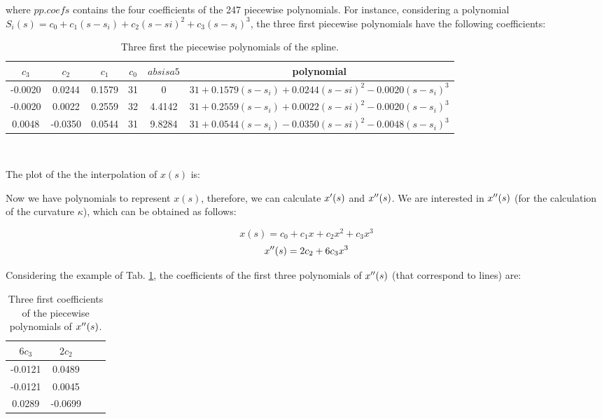 \documentclass{ws-procs9x6}
\begin{document}
where $pp.coefs$ contains the four coefficients of the 247 piecewise
polynomials.  
For instance, considering a polynomial $S_{i}(s)= c_{0} +
c_{1}(s-s_{i})+c_{2}(s-s{i})^{2}+c_{3}(s-s_{i})^{3}$, the three first piecewise polynomials
have the following coefficients:

\begin{table}[h!tpb]
\centering
\begin{tabular}{c  c  c  c  c  c}\\\hline
$c_{3}$ & $c_{2}$ & $c_{1}$ &$c_{0}$ &$absisa5$ & polynomial\\\hline
-0.0020 & 0.0244 & 0.1579 & 31 & 0 &  $31 +0.1579(s-s_{i})+0.0244(s-s{i})^{2}-0.0020(s-s_{i})^{3}$\\\hline
-0.0020 & 0.0022 & 0.2559 & 32 & 4.4142 &$31 +0.2559(s-s_{i})+0.0022(s-s{i})^{2}-0.0020(s-s_{i})^{3}$\\\hline
0.0048 & -0.0350 & 0.0544 & 31 & 9.8284 &$31 +0.0544(s-s_{i})-0.0350(s-s{i})^{2}-0.0048(s-s_{i})^{3}$\\\hline
\end{tabular}\\

\label{tab:coef}
\caption{Three first the piecewise polynomials of the spline.}
\end{table}

The plot of the the interpolation of $x(s)$ is:

\begin{figure}
\end{figure}

\begin{figure}
\centering
{}
\end{figure}





Now we have polynomials to represent $x(s)$, therefore, we can
calculate $x\sp{\prime}(s)$ and $x\sp{\prime\prime}(s)$.  We are
interested in $x\sp{\prime\prime}(s)$ (for the calculation of the
curvature $\kappa$), which can be obtained as follows:


$$x(s)= c_{0} + c_{1}x+c_{2}x^{2}+c_{3}x^{3}$$
$$x\sp{\prime\prime}(s) =  2c_{2}+ 6c_{3}x^{3}$$


Considering the example of Tab. \ref{tab:coef}, the coefficients of
the first three polynomials of $x\sp{\prime\prime}(s)$ (that
correspond to lines) are:

\begin{table}[h!tpb]
\centering
\begin{tabular}{|c | c | c | c |}\\\hline
$6c_{3}$ & $2c_{2}$  \\\hline
-0.0121 & 0.0489  \\\hline
-0.0121 & 0.0045  \\\hline
0.0289 & -0.0699  \\\hline
\end{tabular}\\

\label{tab:coef2}
\caption{Three first coefficients of the piecewise polynomials of
  $x\sp{\prime\prime}(s)$.}
\end{table}
\end{document}
